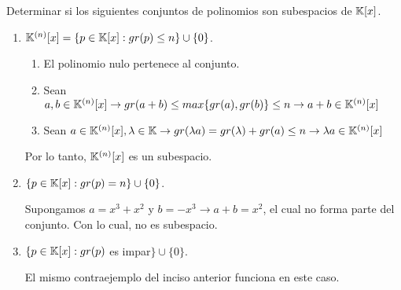 \item Determinar si los siguientes conjuntos de polinomios son subespacios de $\mathbb{K}[x]$.
    \begin{enumerate}
        \item $\mathbb{K}^{(n)}[x]=\{p\in\mathbb{K}[x]:gr(p)\leq n\}\cup\{0\}$.
            \begin{mdframed}[style=s]
                \begin{enumerate}
                    \item El polinomio nulo pertenece al conjunto.
                    \item Sean $a,b\in\mathbb{K}^{(n)}[x]\to gr(a+b)\leq max\{gr(a),gr(b)\}\leq n\to a+b\in\mathbb{K}^{(n)}[x]$
                    \item Sean $a\in\mathbb{K}^{(n)}[x],\lambda\in\mathbb{K}\to gr(\lambda a)=gr(\lambda)+gr(a)\leq n\to \lambda a\in \mathbb{K}^{(n)}[x]$
                \end{enumerate}
                Por lo tanto, $\mathbb{K}^{(n)}[x]$ es un subespacio.
            \end{mdframed}
        \item $\{p\in\mathbb{K}[x]:gr(p)=n\}\cup\{0\}$.
            \begin{mdframed}[style=s]
                Supongamos $a=x^3+x^2$ y $b=-x^3\to a+b=x^2$, el cual no forma parte del conjunto. Con lo cual, no es subespacio.
            \end{mdframed}
        \item $\{p\in\mathbb{K}[x]:gr(p)$ es impar$\}\cup\{0\}$.
            \begin{mdframed}[style=s]
                El mismo contraejemplo del inciso anterior funciona en este caso.
            \end{mdframed}
    \end{enumerate}